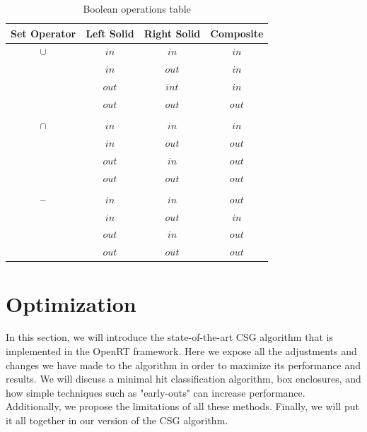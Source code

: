 \documentclass[a4paper,11pt,oneside]{article}
\newcommand{\minus}{\scalebox{0.9}[1.0]{$-$}} %
\begin{document}
\begin{table}[H]
	\centering
	\caption{Boolean operations table}
	\label{section3:boolean_algebra}
	\begin{tabular}{||c c c c||} 
		\hline
		Set Operator & Left Solid & Right Solid & Composite \\ [0.5ex] 
		\hline\hline
		$\cup$       & $in$       & $in$        & $in$      \\
		             & $in$       & $out$       & $in$      \\
		             & $out$      & $int$       & $in$      \\
		             & $out$      & $out$       & $out$     \\
		             &            &             &           \\
		$\cap$       & $in$       & $in$        & $in$      \\
		             & $in$       & $out$       & $out$     \\
		             & $out$      & $in$        & $out$     \\
		             & $out$      & $out$       & $out$     \\
		             &            &             &           \\
		$\minus$     & $in$       & $in$        & $out$     \\
		             & $in$       & $out$       & $in$      \\
		             & $out$      & $in$        & $out$     \\
		             & $out$      & $out$       & $out$     \\		 	   	
		\hline
	\end{tabular}
\end{table}

\section{Optimization}

In this section, we will introduce the state-of-the-art CSG algorithm that is implemented in the OpenRT framework. Here we expose all the adjustments and changes we have made to the algorithm in order to maximize its performance and results. We will discuss a minimal hit classification algorithm, box enclosures, and how simple techniques such as "early-outs" can increase performance. Additionally, we propose the limitations of all these methods. Finally, we will put it all together in our version of the CSG algorithm.
\end{document}
